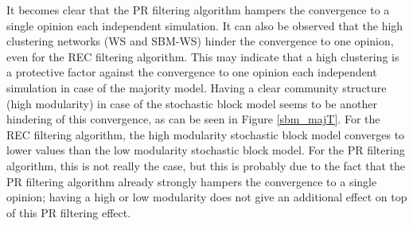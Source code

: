 \documentclass[11 pt , letterpaper , twoside , openright]{book}
\begin{document}
\newline
It becomes clear that the PR filtering algorithm hampers the convergence to a single opinion each independent simulation. It can also be observed that the high clustering networks (WS and SBM-WS) hinder the convergence to one opinion, even for the REC filtering algorithm. This may indicate that a high clustering is a protective factor against the convergence to one opinion each independent simulation in case of the majority model. Having a clear community structure (high modularity) in case of the stochastic block model seems to be another hindering of this convergence, as can be seen in Figure \ref{sbm_majT}.  For the REC filtering algorithm, the high modularity stochastic block model converges to lower values than the low modularity stochastic block model. For the PR filtering algorithm, this is not really the case, but this is probably due to the fact that the PR filtering algorithm already strongly hampers the convergence to a single opinion; having a high or low modularity does not give an additional effect on top of this PR filtering effect.
\end{document}
